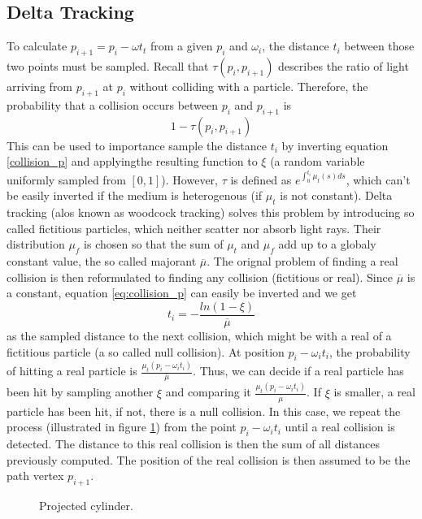 \subsection{Delta Tracking}
To calculate $p_{i+1} = p_i - \omega t_t$ from a given $p_i$ and $\omega_i$, the distance $t_i$ between those two points must be sampled. Recall that $\tau(p_i, p_{i+1})$ describes the ratio of light arriving from $p_{i+1}$ at $p_i$ without colliding with a particle. Therefore, the probability that a collision occurs between $p_i$ and $p_{i+1}$ is 
\begin{equation} \label{eq:collision_p}
1 - \tau({p_i, p_{i+1}})
\end{equation}
This can be used to importance sample the distance $t_i$ by inverting equation \ref{collision_p} and applyingthe resulting function to $\xi$ (a random variable uniformly sampled from $[0,1]$). However, $\tau$ is defined as $e^{\int_{0}^{t_i}\mu_t(s)ds}$, which can't be easily inverted if the medium is heterogenous (if $\mu_t$ is not constant).
Delta tracking (alos known as woodcock tracking) solves this problem by introducing so called fictitious particles, which neither scatter nor absorb light rays. Their distribution $\mu_f$ is chosen so that the sum of $\mu_t$ and $\mu_f$ add up to a globaly constant value, the so called majorant $\overline{\mu}$.
The orignal problem of finding a real collision is then reformulated to finding any collision (fictitious or real).
Since $\overline{\mu}$ is a constant, equation \ref{eq:collision_p} can easily be inverted and we get
\begin{equation}
t_i = - \frac{ln(1 - \xi)}{\overline{\mu}}
\end{equation} 
as the sampled distance to the next collision, which might be with a real of a fictitious particle (a so called null collision).
At position $p_i - \omega_i t_i$, the probability of hitting a real particle is $\frac{\mu_t(p_i - \omega_i t_i)}{\overline{\mu}}$. Thus, we can decide if a real particle has been hit by sampling another $\xi$ and comparing it  $\frac{\mu_t(p_i - \omega_i t_i)}{\overline{\mu}}$. If $\xi$ is smaller, a real particle has been hit, if not, there is a null collision.
In this case, we repeat the process (illustrated in figure \ref{fig:delta_tracking}) from the point $p_i - \omega_i t_i$ until a real collision is detected. The distance to this real collision is then the sum of all distances previously computed.
The position of the real collision is then assumed to be the path vertex $p_{i+1}$.
\begin{figure}
\centering
\def\svgwidth{\columnwidth}


  \caption{\label{fig:delta_tracking}
         Projected cylinder.}
\end{figure}


